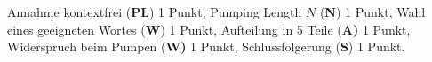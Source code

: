 \begin{bewertung}
Annahme kontextfrei ({\bf PL}) 1 Punkt,
Pumping Length $N$ ({\bf N}) 1 Punkt,
Wahl eines geeigneten Wortes ({\bf W}) 1 Punkt,
Aufteilung in 5 Teile {(\bf A)} 1 Punkt,
Widerspruch beim Pumpen ({\bf W)} 1 Punkt,
Schlussfolgerung ({\bf S}) 1 Punkt.
\end{bewertung}

